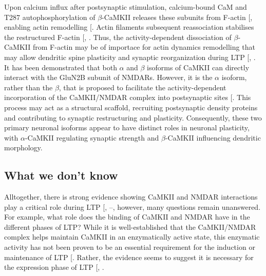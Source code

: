\documentclass[
  11pt,
  letterpaper,
]{scrreprt}
\begin{document}
Upon calcium influx after postsynaptic stimulation, calcium-bound CaM
and T287 autophosphorylation of \(\beta\)-CaMKII releases these subunits
from F-actin {[}\citeproc{ref-brocke1999Functional}{232}{]}, enabling
actin remodelling {[}\citeproc{ref-okamoto2007Role}{229}{]}. Actin
filaments subsequent reassociation stabilises the restructured F-actin
{[},
\citeproc{ref-okamoto2004Rapid}{233}{]}. Thus, the activity-dependent
dissociation of \(\beta\)-CaMKII from F-actin may be of importace for
actin dynamics remodelling that may allow dendritic spine plasticity and
synaptic reorganization during LTP
{[},
\citeproc{ref-borovac2018Regulation}{235}{]}. It has been demonstrated
that both \(\alpha\) and \(\beta\) isoforms of CaMKII can directly
interact with the GluN2B subunit of NMDARs. However, it is the
\(\alpha\) isoform, rather than the \(\beta\), that is proposed to
facilitate the activity-dependent incorporation of the CaMKII/NMDAR
complex into postsynaptic sites
{[}\citeproc{ref-fink2003Selective}{236}{]}. This process may act as a
structural scaffold, recruiting postsynaptic density proteins and
contributing to synaptic restructuring and plasticity. Consequently,
these two primary neuronal isoforms appear to have distinct roles in
neuronal plasticity, with \(\alpha\)-CaMKII regulating synaptic strength
and \(\beta\)-CaMKII influencing dendritic morphology.

\subsection*{What we don't know}\label{what-we-dont-know}

Alltogether, there is strong evidence showing CaMKII and NMDAR
interactions play a critical role during LTP
{[},
--\citeproc{ref-foster2010Distinct}{217}{]},
however, many questions remain unanswered. For example, what role does
the binding of CaMKII and NMDAR have in the different phases of LTP?
While it is well-established that the CaMKII/NMDAR complex helps
maintain CaMKII in an enzymatically active state, this enzymatic
activity has not been proven to be an essential requirement for the
induction or maintenance of LTP
{[}\citeproc{ref-incontro2018CaMKII}{47}{]}. Rather, the evidence seems
to suggest it is necessary for the expression phase of LTP
{[},
\citeproc{ref-rumian2024LTP}{211}{]}.
\end{document}
